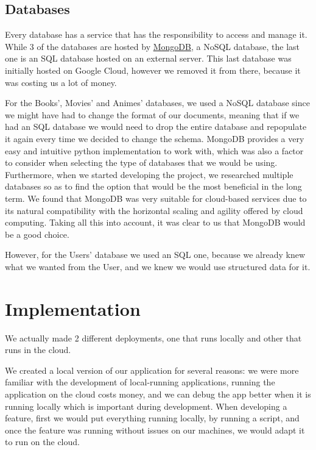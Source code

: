\documentclass[oneside]{article}
\newcommand*\fpar{\hspace{1ex}}
\begin{document}
  \subsection{Databases}
  \fpar Every database has a service that has the responsibility to access and manage it. While 3 of the databases are hosted by \href{https://www.mongodb.com/}{MongoDB}, a NoSQL database, the last one is an SQL database hosted on an external server. This last database was initially hosted on Google Cloud, however we removed it from there, because it was costing us a lot of money.
  \par For the Books', Movies' and Animes' databases, we used a NoSQL database since we might have had to change the format of our documents, meaning that if we had an SQL database we would need to drop the entire database and repopulate it again every time we decided to change the schema. MongoDB provides a very easy and intuitive python implementation to work with, which was also a factor to consider when selecting the type of databases that we would be using. Furthermore, when we started developing the project, we researched multiple databases so as to find the option that would be the most beneficial in the long term. We found that MongoDB was very suitable for cloud-based services due to its natural compatibility with the horizontal scaling and agility offered by cloud computing. Taking all this into account, it was clear to us that MongoDB would be a good choice.
  \par However, for the Users' database we used an SQL one, because we already knew what we wanted from the User, and we knew we would use structured data for it.

\section{Implementation}
\label{sec:implementation}
\fpar We actually made 2 different deployments, one that runs locally and other that runs in the cloud.
\par We created a local version of our application for several reasons: we were more familiar with the development of local-running applications, running the application on the cloud costs money, and we can debug the app better when it is running locally which is important during development. When developing a feature, first we would put everything running locally, by running a script, and once the feature was running without issues on our machines, we would adapt it to run on the cloud.
\end{document}
